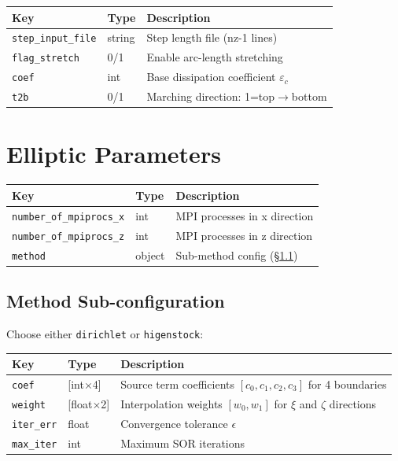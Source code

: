 \documentclass[11pt,a4paper]{report}
\begin{document}
\begin{longtable}{p{5.5cm} p{2cm} p{7cm}}
\toprule
\textbf{Key} & \textbf{Type} & \textbf{Description} \\
\midrule
\texttt{step\_input\_file} & string & Step length file (nz-1 lines) \\
\texttt{flag\_stretch} & 0/1 & Enable arc-length stretching \\
\texttt{coef} & int & Base dissipation coefficient $\varepsilon_c$ \\
\texttt{t2b} & 0/1 & Marching direction: 1=top$\to$bottom \\
\bottomrule
\end{longtable}

\section{Elliptic Parameters}

\begin{longtable}{p{5.5cm} p{2cm} p{7cm}}
\toprule
\textbf{Key} & \textbf{Type} & \textbf{Description} \\
\midrule
\texttt{number\_of\_mpiprocs\_x} & int & MPI processes in x direction \\
\texttt{number\_of\_mpiprocs\_z} & int & MPI processes in z direction \\
\texttt{method} & object & Sub-method config (\S\ref{sec:method-config}) \\
\bottomrule
\end{longtable}

\subsection{Method Sub-configuration}
\label{sec:method-config}

Choose either \texttt{dirichlet} or \texttt{higenstock}:

\begin{longtable}{p{5.5cm} p{2cm} p{7cm}}
\toprule
\textbf{Key} & \textbf{Type} & \textbf{Description} \\
\midrule
\texttt{coef} & [int$\times$4] & Source term coefficients $[c_0, c_1, c_2, c_3]$ for 4 boundaries \\
\texttt{weight} & [float$\times$2] & Interpolation weights $[w_0, w_1]$ for $\xi$ and $\zeta$ directions \\
\texttt{iter\_err} & float & Convergence tolerance $\epsilon$ \\
\texttt{max\_iter} & int & Maximum SOR iterations \\
\bottomrule
\end{longtable}
\end{document}
